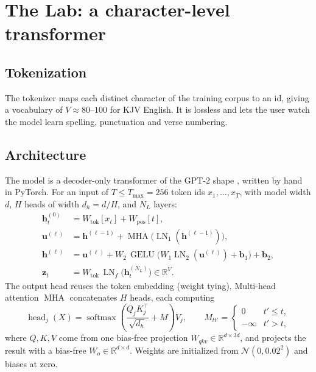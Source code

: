 \documentclass[11pt]{article}
\newcommand{\R}{\mathbb{R}}
\newcommand{\softmax}{\operatorname{softmax}}
\newcommand{\LN}{\operatorname{LN}}
\newcommand{\GELU}{\operatorname{GELU}}
\newcommand{\MHA}{\operatorname{MHA}}
\begin{document}
\section{The Lab: a character-level transformer}\label{sec:lab}

\subsection{Tokenization}

The tokenizer maps each distinct character of the training corpus to an id,
giving a vocabulary of $V \approx 80$--$100$ for KJV English. It is lossless and
lets the user watch the model learn spelling, punctuation and verse numbering.

\subsection{Architecture}

The model is a decoder-only transformer of the GPT-2 shape \cite{gpt2}, written
by hand in PyTorch. For an input of $T \le T_{\max} = 256$ token ids
$x_1, \dots, x_T$, with model width $d$, $H$ heads of width $d_h = d / H$, and
$N_L$ layers:
\begin{align}
  \bm{h}^{(0)}_t &= W_{\text{tok}}[x_t] + W_{\text{pos}}[t], \\
  \bm{u}^{(\ell)} &= \bm{h}^{(\ell-1)} + \MHA\bigl(\LN_1(\bm{h}^{(\ell-1)})\bigr), \\
  \bm{h}^{(\ell)} &= \bm{u}^{(\ell)} + W_2\,\GELU\bigl(W_1 \LN_2(\bm{u}^{(\ell)}) + \bm{b}_1\bigr) + \bm{b}_2, \\
  \bm{z}_t &= W_{\text{tok}}\,\LN_f\bigl(\bm{h}^{(N_L)}_t\bigr) \in \R^{V}.
\end{align}
The output head reuses the token embedding (weight tying). Multi-head attention
$\MHA$ concatenates $H$ heads, each computing
\begin{equation}\label{eq:attn}
  \operatorname{head}_j(X) = \softmax\!\left(\frac{Q_j K_j^\top}{\sqrt{d_h}} + M\right) V_j,
  \qquad
  M_{tt'} = \begin{cases} 0 & t' \le t, \\ -\infty & t' > t, \end{cases}
\end{equation}
where $Q, K, V$ come from one bias-free projection $W_{qkv} \in \R^{d \times 3d}$,
and projects the result with a bias-free $W_o \in \R^{d\times d}$. Weights are
initialized from $\mathcal{N}(0, 0.02^2)$ and biases at zero.
\end{document}
